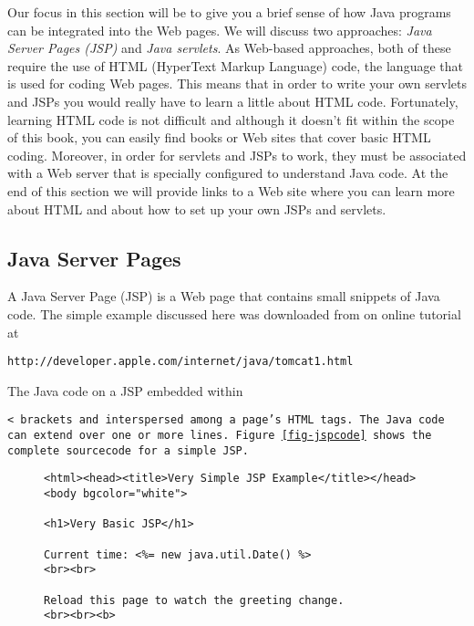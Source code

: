 {Our focus in this section will be to give you a brief sense of how
Java programs can be integrated into the Web pages. We will discuss
two approaches: {\em Java Server Pages (JSP)} and {\em Java servlets}.  As
Web-based approaches, both of these require the use of HTML (HyperText
Markup Language) code, the language that is used for coding Web
pages. This means that in order to write your own servlets and JSPs
you would really have to learn a little about HTML code.  Fortunately,
learning HTML code is not difficult and although it doesn't fit within
the scope of this book, you can easily find books or Web sites that
cover basic HTML coding.  Moreover, in order for servlets and JSPs to
work, they must be associated with a Web server that is specially
configured to understand Java code.  At the end of this section we
will provide links to a Web site where you can learn more about HTML
and about how to set up your own JSPs and servlets.

\subsection{Java Server Pages}

A Java Server Page (JSP) is a Web page that contains small snippets of
Java code.  The simple example discussed here was downloaded from on
online tutorial at 

\begin{jjjlisting}
\begin{lstlisting}[commentstyle=\color{black}]
 http://developer.apple.com/internet/java/tomcat1.html
\end{lstlisting}
\end{jjjlisting}

\noindent The Java code on a JSP embedded within {\tt <%
brackets and interspersed among a page's HTML tags. The Java code can
extend over one or more lines. Figure~\ref{fig-jspcode} shows the
complete sourcecode for a simple JSP.

\begin{figure}[h!]
\jjjprogstart
\begin{jjjlisting}
\begin{lstlisting}
<html><head><title>Very Simple JSP Example</title></head>
<body bgcolor="white">

<h1>Very Basic JSP</h1>

Current time: <%= new java.util.Date() %>
<br><br>

Reload this page to watch the greeting change.
<br><br><b>


\end{lstlisting}
\end{jjjlisting}
\end{figure}}}
